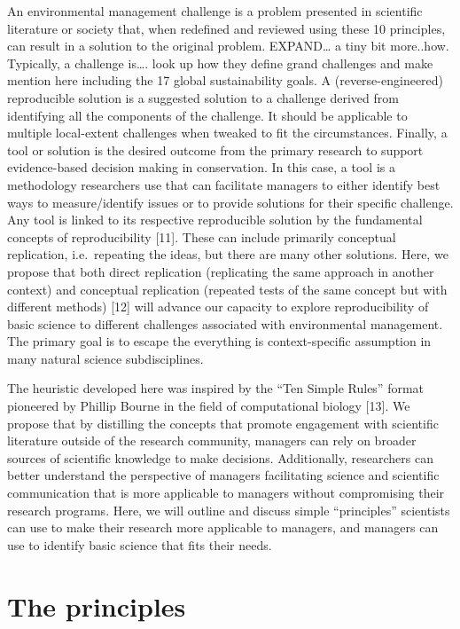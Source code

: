\documentclass[10pt,letterpaper]{article}
\begin{document}
An environmental management challenge is a problem presented in
scientific literature or society that, when redefined and reviewed using
these 10 principles, can result in a solution to the original problem.
EXPAND\ldots{} a tiny bit more..how. Typically, a challenge is\ldots{}.
look up how they define grand challenges and make mention here including
the 17 global sustainability goals. A (reverse-engineered) reproducible
solution is a suggested solution to a challenge derived from identifying
all the components of the challenge. It should be applicable to multiple
local-extent challenges when tweaked to fit the circumstances. Finally,
a tool or solution is the desired outcome from the primary research to
support evidence-based decision making in conservation. In this case, a
tool is a methodology researchers use that can facilitate managers to
either identify best ways to measure/identify issues or to provide
solutions for their specific challenge. Any tool is linked to its
respective reproducible solution by the fundamental concepts of
reproducibility {[}11{]}. These can include primarily conceptual
replication, i.e.~repeating the ideas, but there are many other
solutions. Here, we propose that both direct replication (replicating
the same approach in another context) and conceptual replication
(repeated tests of the same concept but with different methods) {[}12{]}
will advance our capacity to explore reproducibility of basic science to
different challenges associated with environmental management. The
primary goal is to escape the everything is context-specific assumption
in many natural science subdisciplines.

The heuristic developed here was inspired by the ``Ten Simple Rules''
format pioneered by Phillip Bourne in the field of computational biology
{[}13{]}. We propose that by distilling the concepts that promote
engagement with scientific literature outside of the research community,
managers can rely on broader sources of scientific knowledge to make
decisions. Additionally, researchers can better understand the
perspective of managers facilitating science and scientific
communication that is more applicable to managers without compromising
their research programs. Here, we will outline and discuss simple
``principles'' scientists can use to make their research more applicable
to managers, and managers can use to identify basic science that fits
their needs.

\section{The principles}\label{the-principles}
\end{document}
